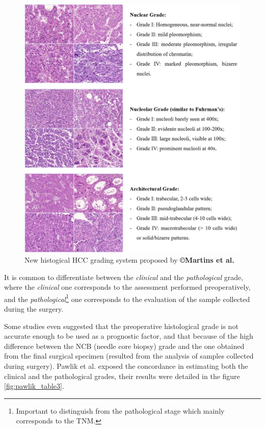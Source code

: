 \documentclass[]{article}
\begin{document}
\begin{figure}[th!]
\centering
\includegraphics[width=0.9\linewidth]{images/martins2017_fig5}
\caption{New histogical HCC grading system proposed by \textbf{©Martins et al. \cite{Martins2017}}}
\label{fig:martins2017_fig5}
\end{figure}


It is common to differentiate between the \emph{clinical} and the
\emph{pathological} grade, where the \emph{clinical} one corresponds to the assessment
performed preoperatively, and the \emph{pathological}\footnote{Important to distinguish from the pathological stage which mainly corresponds to the TNM.} one corresponds to the evaluation
of the sample collected during the surgery.

Some studies even suggested that the preoperative histological grade is
not accurate enough to be used as a prognostic factor, and that because
of the high difference between the NCB (needle core biopsy) grade and the
one obtained from the final surgical specimen (resulted from the
analysis of samples collected during surgery). Pawlik et al.
exposed the concordance in estimating both the clinical and the pathological grades, their results were detailed in the figure \ref{fig:pawlik_table3}.
\end{document}
